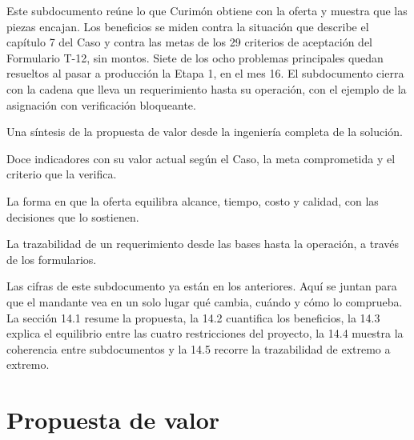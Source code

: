 
\begin{resumenApertura}
Este subdocumento reúne lo que Curimón obtiene con la oferta y muestra que las piezas encajan. Los
beneficios se miden contra la situación que describe el capítulo 7 del Caso y contra las metas de los 29
criterios de aceptación del Formulario T-12, sin montos. Siete de los ocho problemas principales quedan
resueltos al pasar a producción la Etapa 1, en el mes 16. El subdocumento cierra con la cadena que lleva
un requerimiento hasta su operación, con el ejemplo de la asignación con verificación bloqueante.
\begin{recibe}
  \item Una síntesis de la propuesta de valor desde la ingeniería completa de la solución.
  \item Doce indicadores con su valor actual según el Caso, la meta comprometida y el criterio que la verifica.
  \item La forma en que la oferta equilibra alcance, tiempo, costo y calidad, con las decisiones que lo sostienen.
  \item La trazabilidad de un requerimiento desde las bases hasta la operación, a través de los formularios.
\end{recibe}
\end{resumenApertura}

Las cifras de este subdocumento ya están en los anteriores. Aquí se juntan para que el mandante vea en un
solo lugar qué cambia, cuándo y cómo lo comprueba. La sección 14.1 resume la propuesta, la 14.2
cuantifica los beneficios, la 14.3 explica el equilibrio entre las cuatro restricciones del proyecto, la
14.4 muestra la coherencia entre subdocumentos y la 14.5 recorre la trazabilidad de extremo a extremo.

\section{Propuesta de valor}\label{sec:14-propuesta-de-valor}

